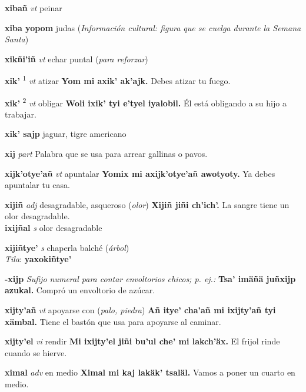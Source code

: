 \documentclass[10pt]{scrbook}
\newcommand{\entry}[1]{\textbf{#1}}
\newcommand{\defsuperscript}[1]{\textsuperscript{#1}}
\newcommand{\nontranslationdef}[1]{\textit{#1}}
\newcommand{\partofspeech}[1]{\textit{#1}}
\newcommand{\spanishtranslation}[1]{#1}
\newcommand{\clarification}[1]{(\textit{#1})}
\newcommand{\cholexample}[1]{\textbf{#1}}
\newcommand{\exampletranslation}[1]{#1}
\newcommand{\dialectvariant}[1]{\\\textit{#1}:}
\newcommand{\dialectword}[1]{\textbf{#1}}
\newcommand{\culturalinformation}[1]{(\textit{#1})}
\newcommand{\secondaryentry}[1]{\\\textbf{#1}}
\newcommand{\secondpartofspeech}[1]{\textit{#1}}
\newcommand{\secondtranslation}[1]{#1}
\begin{document}
\begin{multicols}{2}
\entry{xibañ}
\partofspeech{vt}
\spanishtranslation{peinar}

\entry{xiba yopom}
\spanishtranslation{judas}
\culturalinformation{Información cultural: figura que se cuelga durante la Semana Santa}

\entry{xikñi'iñ}
\partofspeech{vt}
\spanishtranslation{echar puntal}
\clarification{para reforzar}

\entry{xik'}
\defsuperscript{1}
\partofspeech{vt}
\spanishtranslation{atizar}
\cholexample{Yom mi axik' ak'ajk.}
\exampletranslation{Debes atizar tu fuego.}

\entry{xik'}
\defsuperscript{2}
\partofspeech{vt}
\spanishtranslation{obligar}
\cholexample{Woli ixik' tyi e'tyel iyalobil.}
\exampletranslation{Él está obligando a su hijo a trabajar.}

\entry{xik' sajp}
\spanishtranslation{jaguar, tigre americano}

\entry{xij}
\partofspeech{part}
\spanishtranslation{Palabra que se usa para arrear gallinas o pavos.}

\entry{xijk'otye'añ}
\partofspeech{vt}
\spanishtranslation{apuntalar}
\cholexample{Yomix mi axijk'otye'añ awotyoty.}
\exampletranslation{Ya debes apuntalar tu casa.}

\entry{xijiñ}
\partofspeech{adj}
\spanishtranslation{desagradable, asqueroso}
\clarification{olor}
\cholexample{Xijiñ jiñi ch'ich'.}
\exampletranslation{La sangre tiene un olor desagradable.}
\secondaryentry{ixijñal}
\secondpartofspeech{s}
\secondtranslation{olor desagradable}

\entry{xijiñtye'}
\partofspeech{s}
\spanishtranslation{chaperla}
\spanishtranslation{balché}
\clarification{árbol}
\dialectvariant{Tila}
\dialectword{yaxokiñtye'}

\entry{-xijp}
\nontranslationdef{Sufijo numeral para contar envoltorios chicos; p. ej.:}
\cholexample{Tsa' imäñä juñxijp azukal.}
\exampletranslation{Compró un envoltorio de azúcar.}

\entry{xijty'añ}
\partofspeech{vt}
\spanishtranslation{apoyarse con}
\clarification{palo, piedra}
\cholexample{Añ itye' cha'añ mi ixijty'añ tyi xämbal.}
\exampletranslation{Tiene el bastón que usa para apoyarse al caminar.}

\entry{xijty'el}
\partofspeech{vi}
\spanishtranslation{rendir}
\cholexample{Mi ixijty'el jiñi bu'ul che' mi lakch'äx.}
\exampletranslation{El frijol rinde cuando se hierve.}

\entry{ximal}
\partofspeech{adv}
\spanishtranslation{en medio}
\cholexample{Ximal mi kaj lakäk' tsaläl.}
\exampletranslation{Vamos a poner un cuarto en medio.}


\end{multicols}
\end{document}
